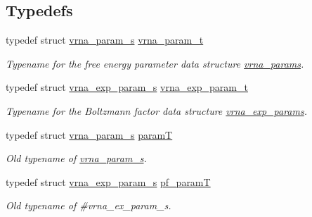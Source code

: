 \subsection*{Typedefs}
\begin{DoxyCompactItemize}
\item 
\hypertarget{group__energy__parameters_ga8a69ca7d787e4fd6079914f5343a1f35}{typedef struct \hyperlink{group__energy__parameters_structvrna__param__s}{vrna\-\_\-param\-\_\-s} \hyperlink{group__energy__parameters_ga8a69ca7d787e4fd6079914f5343a1f35}{vrna\-\_\-param\-\_\-t}}\label{group__energy__parameters_ga8a69ca7d787e4fd6079914f5343a1f35}

\begin{DoxyCompactList}\small\item\em Typename for the free energy parameter data structure \hyperlink{group__energy__parameters_gad0e3e7e74bdc50d1709d40c92993185e}{vrna\-\_\-params}. \end{DoxyCompactList}\item 
\hypertarget{group__energy__parameters_ga01d8b92fe734df8d79a6169482c7d8d8}{typedef struct \hyperlink{group__energy__parameters_structvrna__exp__param__s}{vrna\-\_\-exp\-\_\-param\-\_\-s} \hyperlink{group__energy__parameters_ga01d8b92fe734df8d79a6169482c7d8d8}{vrna\-\_\-exp\-\_\-param\-\_\-t}}\label{group__energy__parameters_ga01d8b92fe734df8d79a6169482c7d8d8}

\begin{DoxyCompactList}\small\item\em Typename for the Boltzmann factor data structure \hyperlink{group__energy__parameters_gab1f3016f96aa96bff020cdd904605afa}{vrna\-\_\-exp\-\_\-params}. \end{DoxyCompactList}\item 
typedef struct \hyperlink{group__energy__parameters_structvrna__param__s}{vrna\-\_\-param\-\_\-s} \hyperlink{group__energy__parameters_ga857dde86357d306cc902f0d8b2797659}{param\-T}
\begin{DoxyCompactList}\small\item\em Old typename of \hyperlink{group__energy__parameters_structvrna__param__s}{vrna\-\_\-param\-\_\-s}. \end{DoxyCompactList}\item 
typedef struct \hyperlink{group__energy__parameters_structvrna__exp__param__s}{vrna\-\_\-exp\-\_\-param\-\_\-s} \hyperlink{group__energy__parameters_ga8bffe1828e2cbec101769f5cc0b1535b}{pf\-\_\-param\-T}
\begin{DoxyCompactList}\small\item\em Old typename of \#vrna\-\_\-ex\-\_\-param\-\_\-s. \end{DoxyCompactList}\end{DoxyCompactItemize}
